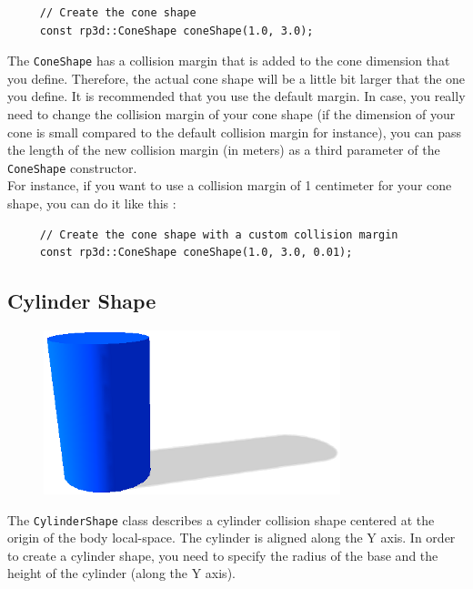 \documentclass[a4paper,12pt]{article}
\begin{document}
    \begin{lstlisting}
     // Create the cone shape
     const rp3d::ConeShape coneShape(1.0, 3.0);
  \end{lstlisting}

    \vspace{0.6cm}

    The \texttt{ConeShape} has a collision margin that is added to the cone dimension that you define. Therefore, the actual cone shape will be a little bit larger that the one you define.
    It is recommended that you use the default margin. In case, you really need to change the collision margin of your cone shape (if the dimension of your cone is small compared
    to the default collision margin for instance), you can pass the length of the new collision margin (in meters) as a third parameter of the \texttt{ConeShape} constructor. \\

    For instance, if you want to use a collision margin of 1 centimeter for your cone shape, you can do it like this : \\

   \begin{lstlisting}
     // Create the cone shape with a custom collision margin
     const rp3d::ConeShape coneShape(1.0, 3.0, 0.01);
  \end{lstlisting}

    \subsection{Cylinder Shape}

    \begin{figure}[h]
        \centering
        \includegraphics{cylindershape.png}
        \label{fig:cylindershape}
    \end{figure}

    The \texttt{CylinderShape} class describes a cylinder collision shape centered at the origin of the body local-space. The cylinder is aligned along the Y axis.
    In order to create a cylinder shape, you need to specify the radius of the base and the height of the cylinder (along the Y axis). \\
\end{document}
